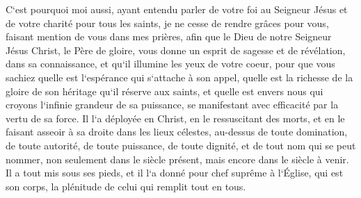 \verse C`est pourquoi moi aussi, ayant entendu parler de votre foi au Seigneur Jésus et de votre charité pour tous les saints, 
\verse je ne cesse de rendre grâces pour vous, faisant mention de vous dans mes prières, 
\verse afin que le Dieu de notre Seigneur Jésus Christ, le Père de gloire, vous donne un esprit de sagesse et de révélation, dans sa connaissance, 
\verse et qu`il illumine les yeux de votre coeur, pour que vous sachiez quelle est l`espérance qui s`attache à son appel, quelle est la richesse de la gloire de son héritage qu`il réserve aux saints, 
\verse et quelle est envers nous qui croyons l`infinie grandeur de sa puissance, se manifestant avec efficacité par la vertu de sa force. 
\verse Il l`a déployée en Christ, en le ressuscitant des morts, et en le faisant asseoir à sa droite dans les lieux célestes, 
\verse au-dessus de toute domination, de toute autorité, de toute puissance, de toute dignité, et de tout nom qui se peut nommer, non seulement dans le siècle présent, mais encore dans le siècle à venir. 
\verse Il a tout mis sous ses pieds, et il l`a donné pour chef suprême à l`Église, 
\verse qui est son corps, la plénitude de celui qui remplit tout en tous. 

